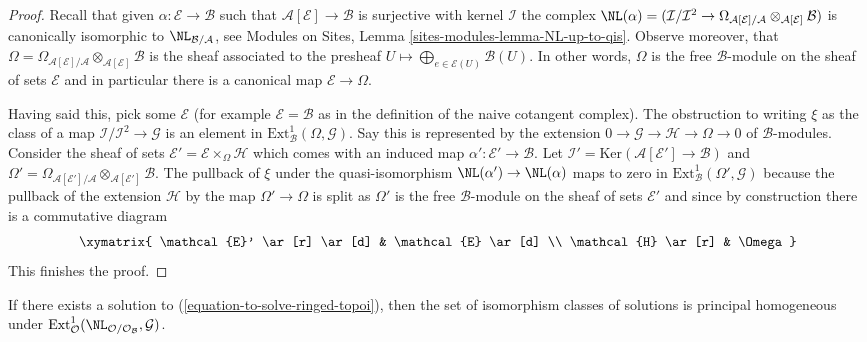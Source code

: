\begin{proof}
Recall that given $\alpha : \mathcal{E} \to \mathcal{B}$
such that $\mathcal{A}[\mathcal{E}] \to \mathcal{B}$ is surjective
with kernel $\mathcal{I}$ the complex
$\NL(\alpha) = (\mathcal{I}/\mathcal{I}^2 \to 
\Omega_{\mathcal{A}[\mathcal{E}]/\mathcal{A}}
\otimes_{\mathcal{A}[\mathcal{E}]} \mathcal{B})$ is canonically
isomorphic to $\NL_{\mathcal{B}/\mathcal{A}}$, see
Modules on Sites, Lemma \ref{sites-modules-lemma-NL-up-to-qis}.
Observe moreover, that
$\Omega = \Omega_{\mathcal{A}[\mathcal{E}]/\mathcal{A}}
\otimes_{\mathcal{A}[\mathcal{E}]} \mathcal{B}$ is the sheaf
associated to the presheaf
$U \mapsto \bigoplus_{e \in \mathcal{E}(U)} \mathcal{B}(U)$.
In other words, $\Omega$ is the free $\mathcal{B}$-module on the
sheaf of sets $\mathcal{E}$ and in particular there is a canonical
map $\mathcal{E} \to \Omega$.

\medskip\noindent
Having said this, pick some $\mathcal{E}$ (for example
$\mathcal{E} = \mathcal{B}$ as in the definition of the naive cotangent
complex). The obstruction to writing $\xi$ as the class of a map
$\mathcal{I}/\mathcal{I}^2 \to \mathcal{G}$ is an element in
$\text{Ext}^1_\mathcal{B}(\Omega, \mathcal{G})$. Say this is represented
by the extension $0 \to \mathcal{G} \to \mathcal{H} \to \Omega \to 0$
of $\mathcal{B}$-modules. Consider the sheaf of sets
$\mathcal{E}' = \mathcal{E} \times_\Omega \mathcal{H}$
which comes with an induced map $\alpha' : \mathcal{E}' \to \mathcal{B}$.
Let $\mathcal{I}' = \text{Ker}(\mathcal{A}[\mathcal{E}'] \to \mathcal{B})$
and $\Omega' = \Omega_{\mathcal{A}[\mathcal{E}']/\mathcal{A}}
\otimes_{\mathcal{A}[\mathcal{E}']} \mathcal{B}$.
The pullback of $\xi$ under the quasi-isomorphism
$\NL(\alpha') \to \NL(\alpha)$ maps to zero in
$\text{Ext}^1_\mathcal{B}(\Omega', \mathcal{G})$
because the pullback of the extension $\mathcal{H}$
by the map $\Omega' \to \Omega$ is split as $\Omega'$ is the free
$\mathcal{B}$-module on the sheaf of sets $\mathcal{E}'$ and since
by construction there is a commutative diagram
$$
\xymatrix{
\mathcal{E}' \ar[r] \ar[d] & \mathcal{E} \ar[d] \\
\mathcal{H} \ar[r] & \Omega
}
$$
This finishes the proof.
\end{proof}

\begin{lemma}
\label{lemma-choices-ringed-topoi}
If there exists a solution to (\ref{equation-to-solve-ringed-topoi}),
then the set of isomorphism classes of solutions is principal homogeneous
under $\text{Ext}^1_\mathcal{O}(
\NL_{\mathcal{O}/\mathcal{O}_\mathcal{B}}, \mathcal{G})$.
\end{lemma}

